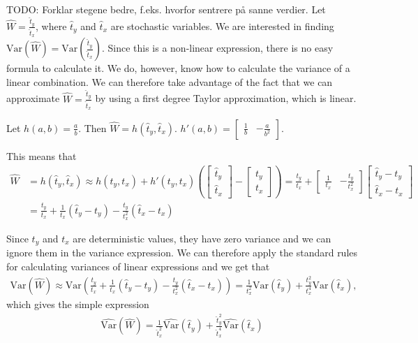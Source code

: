 \documentclass{article}
\begin{document}
\begin{example}
  TODO: Forklar stegene bedre, f.eks. hvorfor sentrere på sanne verdier.
  Let \(\widehat{W} = \frac{\hat{t}_y}{\hat{t}_x}\), where \(\hat{t}_y\) and \(\hat{t}_x\) are stochastic variables. We
  are interested in finding \(\mathrm{Var} \left( \widehat{W} \right) = \mathrm{Var}
  \left( \frac{\hat{t}_y}{\hat{t}_x} \right)\).
  Since this is a non-linear expression, there is no easy formula to calculate
  it. We do, however, know how to calculate the variance of a linear
  combination. We can therefore take advantage of the fact that we can
  approximate \(\widehat{W} = \frac{\hat{t}_y}{\hat{t}_x}\) by using a first degree Taylor approximation,
  which is linear.

  Let \(h(a, b) = \frac{a}{b}\). Then \(\widehat{W} = h(\hat{t}_y, \hat{t}_x)\).
  \(h'(a, b) = \begin{bmatrix} \frac{1}{b} & -\frac{a}{b^2} \end{bmatrix}.\)

  This means that
  \begin{align*}
    \widehat{W} &= h(\hat{t}_y, \hat{t}_x)
    \approx h(t_y, t_x) + h'(t_y, t_x) \left( \begin{bmatrix} \hat{t}_y \\ \hat{t}_x \end{bmatrix}
    - \begin{bmatrix} t_y \\ t_x \end{bmatrix} \right)
    = \frac{t_y}{t_x} + \begin{bmatrix} \frac{1}{t_x} &
    -\frac{t_y}{t_x^2} \end{bmatrix} \begin{bmatrix} \hat{t}_y - t_y \\
      \hat{t}_x - t_x \end{bmatrix} \\
    &= \frac{t_y}{t_x} + \frac{1}{t_x} \left( \hat{t}_y - t_y \right) - \frac{t_y}{t_x^2} \left( \hat{t}_x - t_x \right)
    \end{align*}

    Since \(t_y\) and \(t_x\) are deterministic values, they have zero variance
    and we can ignore them in the variance expression. We can therefore apply
    the standard rules for calculating variances of linear expressions and we
    get that
    \begin{align*}
      \mathrm{Var} \left( \widehat{W} \right) \approx \mathrm{Var} \left(
      \frac{t_y}{t_x} + \frac{1}{t_x} \left( \hat{t}_y - t_y \right) -
      \frac{t_y}{t_x^2} \left( \hat{t}_x - t_x \right) \right)
    = \frac{1}{t_x^2} \mathrm{Var} \left( \hat{t}_y \right) +
      \frac{t_y^2}{t_x^4} \mathrm{Var} \left( \hat{t}_x \right),
      \end{align*}
      which gives the simple expression \begin{align*}
                    \widehat{\mathrm{Var}} \left( \widehat{W} \right) = \frac{1}{\hat{t}_x^2} \widehat{\mathrm{Var}} \left( \hat{t}_y \right) +
                    \frac{\hat{t}_y^2}{\hat{t}_x^4} \widehat{\mathrm{Var}} \left( \hat{t}_x \right)
                    \end{align*}


\end{example}
\end{document}
